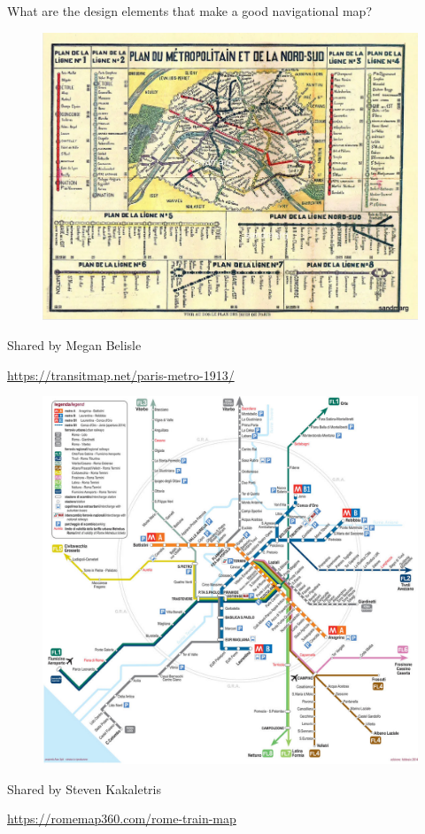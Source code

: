 \documentclass[aspectratio=169]{beamer}
\begin{document}
\begin{frame}
	
	What are the design elements that make a good navigational map?
	
\end{frame}




\begin{frame}
	
		\begin{figure}
			\centering
			\includegraphics[width=0.8\linewidth]{images/paris_1913.png}
		\end{figure}
	
		\tiny Shared by Megan Belisle
		
		\tiny \url{https://transitmap.net/paris-metro-1913/}
	
\end{frame}






\begin{frame}
	
	\begin{figure}
		\centering
		\includegraphics[width=0.6\linewidth]{images/rome-train-map.jpeg}
	\end{figure}
	
	\tiny Shared by Steven Kakaletris
	
	\tiny \url{https://romemap360.com/rome-train-map}
	
\end{frame}
\end{document}
